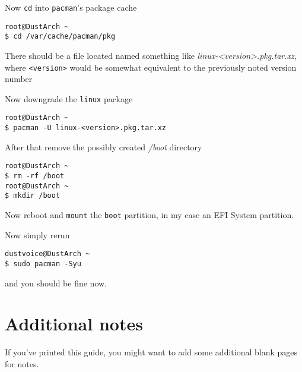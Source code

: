 \documentclass[10pt]{dustdoc}
\begin{document}
Now \texttt{cd} into \texttt{pacman}'s package cache

\begin{verbatim}
root@DustArch ~
$ cd /var/cache/pacman/pkg
\end{verbatim}

There should be a file located named something like \textit{linux-\allowbreak{}<version>.\allowbreak{}pkg.tar.xz}, where \texttt{<version>} would be somewhat equivalent to the previously noted version number

Now downgrade the \texttt{linux} package

\begin{verbatim}
root@DustArch ~
$ pacman -U linux-<version>.pkg.tar.xz
\end{verbatim}

After that remove the possibly created \textit{/boot} directory

\begin{verbatim}
root@DustArch ~
$ rm -rf /boot
root@DustArch ~
$ mkdir /boot
\end{verbatim}

Now reboot and \texttt{mount} the \texttt{boot} partition, in my case an EFI System partition.

Now simply rerun

\begin{verbatim}
dustvoice@DustArch ~
$ sudo pacman -Syu
\end{verbatim}

\noindent
and you should be fine now.

\chapter{Additional notes}
\label{sec:additional-notes}

If you’ve printed this guide, you might want to add some additional blank pages for notes.
\end{document}
